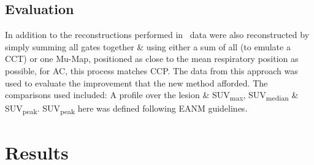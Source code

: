     \vspace{-0.5cm}
    
    \subsection{Evaluation} \label{sec:evaluation}
        
        In addition to the reconstructions performed in~ data were also reconstructed by simply summing all gates together \& using either a sum of all  (to emulate a \gls{CCT}) or one \gls{Mu-Map}, positioned as close to the mean respiratory position as possible, for \gls{AC}, this process matches \gls{CCP}. The data from this approach was used to evaluate the improvement that the new method afforded. The comparisons used included: A profile over the lesion \& \gls{SUV}\textsubscript{max}, \gls{SUV}\textsubscript{median} \& \gls{SUV}\textsubscript{peak}. \gls{SUV}\textsubscript{peak} here was defined following \gls{EANM} guidelines.%

\vspace{-0.5cm}

\section{Results} \label{sec:results}
    
    

